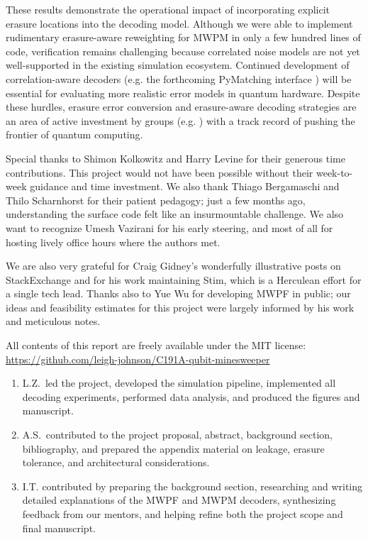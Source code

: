 \documentclass[11pt, notitlepage, letterpaper]{article}
\begin{document}
These results demonstrate the operational impact of incorporating explicit erasure locations into the decoding model. Although we were able to implement rudimentary erasure-aware reweighting for MWPM in only a few hundred lines of code, verification remains challenging because correlated noise models are not yet well-supported in the existing simulation ecosystem. Continued development of correlation-aware decoders (e.g. the forthcoming PyMatching interface \cite{oscarhiggott_oscarhiggottpymatching_2025}) will be essential for evaluating more realistic error models in quantum hardware. Despite these hurdles, erasure error conversion and erasure-aware decoding strategies are an area of active investment by groups (e.g. \citeauthor{bluvstein_architectural_2025}) with a track record of pushing the frontier of quantum computing.


Special thanks to Shimon Kolkowitz and Harry Levine for their generous time contributions. This project would not have been possible without their week-to-week guidance and time investment. We also thank Thiago Bergamaschi and Thilo Scharnhorst for their patient pedagogy; just a few months ago, understanding the surface code felt like an insurmountable challenge. We also want to recognize Umesh Vazirani for his early steering, and most of all for hosting lively office hours where the authors met.

We are also very grateful for Craig Gidney's wonderfully illustrative posts on StackExchange and for his work maintaining Stim, which is a Herculean effort for a single tech lead. Thanks also to Yue Wu for developing MWPF in public; our ideas and feasibility estimates for this project were largely informed by his work and meticulous notes.

All contents of this report are freely available under the MIT license: \href{https://github.com/leigh-johnson/C191A-qubit-minesweeper}{https://github.com/leigh-johnson/C191A-qubit-minesweeper}

\begin{enumerate}
    \item L.Z.\ led the project, developed the simulation pipeline, implemented all decoding
          experiments, performed data analysis, and produced the figures and manuscript.
    \item A.S.\ contributed to the project proposal, abstract, background section, bibliography,
          and prepared the appendix material on leakage, erasure tolerance, and architectural
          considerations.
    \item I.T. contributed by preparing the background section, researching and writing detailed explanations of the MWPF and MWPM decoders, synthesizing feedback from our mentors, and helping refine both the project scope and final manuscript.
\end{enumerate}
\end{document}
